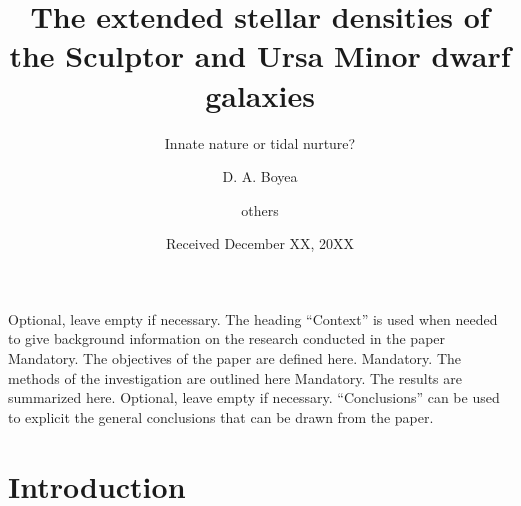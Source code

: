 \documentclass{aa}
\begin{document}
\title{The extended stellar densities of the Sculptor and Ursa Minor dwarf galaxies}

\subtitle{Innate nature or tidal nurture?}

%

   \author{D. A. Boyea
        \and others
        }


   \date{Received December XX, 20XX}

 
  \abstract
   {Optional, leave empty if necessary.  The heading “Context” is used when needed to
give background information on the research conducted in the paper}
   {Mandatory. The objectives of the paper are defined here.} 
   {Mandatory. The methods of the investigation are outlined here}
   {Mandatory. The results are summarized here.}
   {Optional, leave empty if necessary.  “Conclusions” can be used to
explicit the general conclusions that can be drawn from the paper.}


   \maketitle


\section{Introduction}
\lipsum[1]
\end{document}
